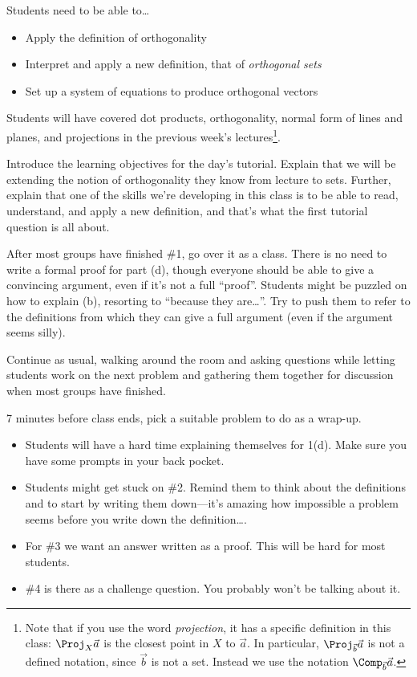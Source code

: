 	Students need to be able to\ldots
	\begin{itemize}
		\item Apply the definition of orthogonality
		\item Interpret and apply a new definition, that of \emph{orthogonal sets}
		\item Set up a system of equations to produce orthogonal vectors
	\end{itemize}

	Students will have covered dot products, orthogonality, normal form of lines and planes, and
		projections in the previous week's lectures\footnote{ Note that if you use the word \emph{projection},
		it has a specific definition in this class: $\Proj_{X}\vec a$ is the closest point in $X$
		to $\vec a$. In particular, $\Proj_{\vec b}\vec a$ is not a defined notation, since $\vec b$ is
		not a set. Instead we use the notation $\Comp_{\vec b}\vec a$.}.

	Introduce the learning objectives for the day's tutorial. Explain that we will be extending
		the notion of orthogonality they know from lecture to sets. Further, explain that one of the skills
		we're developing in this class is to be able to read, understand, and apply a new definition, and that's
		what the first tutorial question is all about.

	
	After most groups have finished \#1, go over it as a class. There is no need to write a formal
		proof for part (d), though everyone should be able to give a convincing argument, even
		if it's not a full ``proof''. Students might be puzzled on how to explain (b),
		resorting to ``because they are\ldots''. Try to push them to refer to the definitions
		from which they can give a full argument (even if the argument seems silly).

	Continue as usual, walking around the room and asking
		questions while letting students work on the next problem and gathering them together
		for discussion when most groups have finished.

		7 minutes before class ends, pick a suitable problem to do as a wrap-up.



	
	\begin{itemize}
		\item Students will have a hard time explaining themselves for 1(d). Make sure you
			have some prompts in your back pocket.
		\item Students might get stuck on \#2. Remind them to think about the definitions and
			to start by writing them down---it's amazing how impossible a problem seems before
			you write down the definition\ldots.
		\item For \#3 we want an answer written as a proof. This will be hard for most students.
		\item \#4 is there as a challenge question. You probably won't be talking about it.

	\end{itemize}